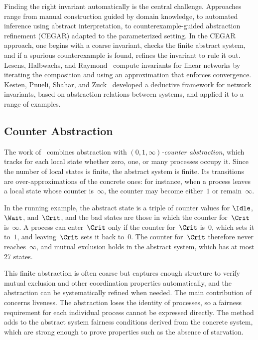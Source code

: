 Finding the right invariant automatically is the central challenge. Approaches
range from manual construction guided by domain knowledge, to automated
inference using abstract interpretation, to counterexample-guided abstraction
refinement (CEGAR) adapted to the parameterized setting. In the CEGAR approach,
one begins with a coarse invariant, checks the finite abstract system, and if
a spurious counterexample is found, refines the invariant to rule it out.
Lesens, Halbwachs, and Raymond~\cite{LHR97} compute invariants for linear
networks by iterating the composition and using an approximation that
enforces convergence. Kesten, Pnueli, Shahar, and Zuck~\cite{KPSZ02} developed
a deductive framework for network invariants, based on abstraction relations
between systems, and applied it to a range of examples.

\subsection{Counter Abstraction}

The work of~\cite{PXZ02} combines abstraction with
\emph{$(0,1,\infty)$-counter abstraction}, which tracks for each local state
whether zero, one, or many processes occupy it. Since the number of local
states is finite, the abstract system is finite. Its transitions are
over-approximations of the concrete ones: for instance, when a process leaves
a local state whose counter is~$\infty$, the counter may become either~$1$
or remain~$\infty$.

In the running example, the abstract state is a triple of counter values for
$\Idle$, $\Wait$, and~$\Crit$, and the bad states are those in which the
counter for~$\Crit$ is~$\infty$. A process can enter~$\Crit$ only if the
counter for~$\Crit$ is~$0$, which sets it to~$1$, and leaving~$\Crit$ sets it
back to~$0$. The counter for~$\Crit$ therefore never reaches~$\infty$, and
mutual exclusion holds in the abstract system, which has at most 27 states.

This finite abstraction is often coarse but captures enough structure to
verify mutual exclusion and other coordination properties automatically, and
the abstraction can be systematically refined when needed. The main
contribution of~\cite{PXZ02} concerns liveness. The abstraction loses the
identity of processes, so a fairness requirement for each individual process
cannot be expressed directly. The method adds to the abstract system
fairness conditions derived from the concrete system, which are strong enough
to prove properties such as the absence of starvation.

